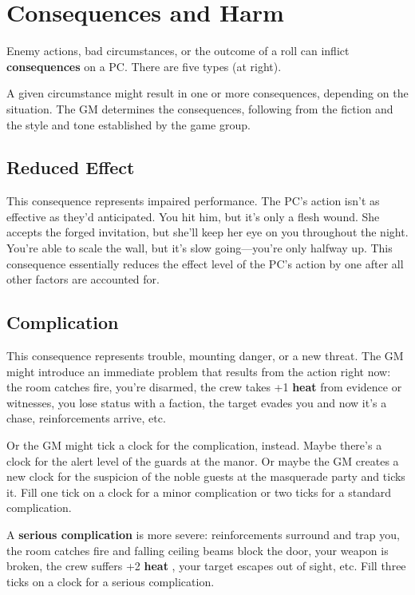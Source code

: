 \documentclass[11pt,fleqn,a5paper]{book}
\newcommand{\gameterm}[1]{\textbf{#1}}
\begin{document}
\chapter{Consequences and Harm}

Enemy actions, bad circumstances, or the outcome of a roll can inflict \textbf{consequences} on a PC. There are five types (at right).

A given circumstance might result in one or more consequences, depending on the situation. The GM determines the consequences, following from the fiction and the style and tone established by the game group.

\section{Reduced Effect}

This consequence represents impaired performance. The PC’s action isn’t as effective as they’d anticipated. You hit him, but it’s only a flesh wound. She accepts the forged invitation, but she’ll keep her eye on you throughout the night. You’re able to scale the wall, but it’s slow going---you’re only halfway up. This consequence essentially reduces the effect level of the PC’s action by one after all other factors are accounted for.

\section{Complication}

This consequence represents trouble, mounting danger, or a new threat. The GM might introduce an immediate problem that results from the action right now: the room catches fire, you’re disarmed, the crew takes +1 \gameterm{heat}  from evidence or witnesses, you lose status with a faction, the target evades you and now it’s a chase, reinforcements arrive, etc.

Or the GM might tick a clock for the complication, instead. Maybe there’s a clock for the alert level of the guards at the manor. Or maybe the GM creates a new clock for the suspicion of the noble guests at the masquerade party and ticks it. Fill one tick on a clock for a minor complication or two ticks for a standard complication.

A \textbf{serious complication} is more severe: reinforcements surround and trap you, the room catches fire and falling ceiling beams block the door, your weapon is broken, the crew suffers +2 \gameterm{heat} , your target escapes out of sight, etc. Fill three ticks on a clock for a serious complication.
\end{document}

